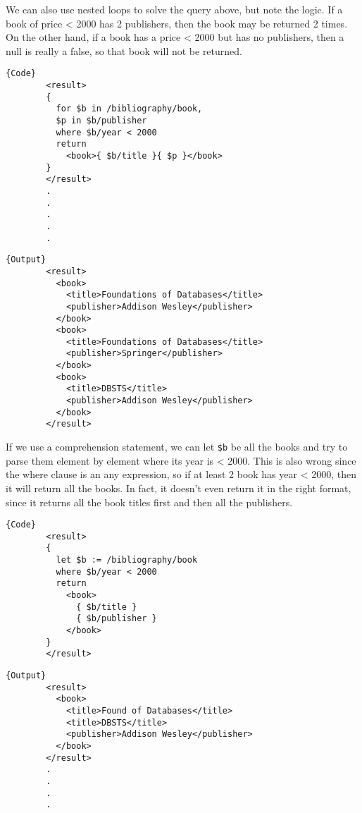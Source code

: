   \begin{example}
    We can also use nested loops to solve the query above, but note the logic. If a book of price < 2000 has 2 publishers, then the book may be returned 2 times. On the other hand, if a book has a price < 2000 but has no publishers, then a null is really a false, so that book will not be returned. 

    \noindent\begin{minipage}{.5\textwidth}
      \begin{lstlisting}[]{Code}
        <result>
        {
          for $b in /bibliography/book,
          $p in $b/publisher
          where $b/year < 2000
          return 
            <book>{ $b/title }{ $p }</book>
        }
        </result> 
        .
        .
        .
        .
        .
      \end{lstlisting}
      \end{minipage}
      \hfill
      \begin{minipage}{.49\textwidth}
      \begin{lstlisting}[]{Output}
        <result>
          <book>
            <title>Foundations of Databases</title>
            <publisher>Addison Wesley</publisher>
          </book>
          <book>
            <title>Foundations of Databases</title>
            <publisher>Springer</publisher>
          </book>
          <book>
            <title>DBSTS</title>
            <publisher>Addison Wesley</publisher>
          </book>
        </result>          
      \end{lstlisting}
    \end{minipage}

    If we use a comprehension statement, we can let \texttt{\$b} be all the books and try to parse them element by element where its year is < 2000. This is also wrong since the where clause is an any expression, so if at least 2 book has year < 2000, then it will return all the books. In fact, it doesn't even return it in the right format, since it returns all the book titles first and then all the publishers. 

    \noindent\begin{minipage}{.5\textwidth}
      \begin{lstlisting}[]{Code}
        <result>
        {
          let $b := /bibliography/book
          where $b/year < 2000
          return 
            <book>
              { $b/title }
              { $b/publisher }
            </book>
        }
        </result>          
      \end{lstlisting}
      \end{minipage}
      \hfill
      \begin{minipage}{.49\textwidth}
      \begin{lstlisting}[]{Output}
        <result>
          <book>
            <title>Found of Databases</title>
            <title>DBSTS</title>
            <publisher>Addison Wesley</publisher>
          </book>
        </result>
        .
        .
        .
        .
      \end{lstlisting}
    \end{minipage}
  \end{example}

